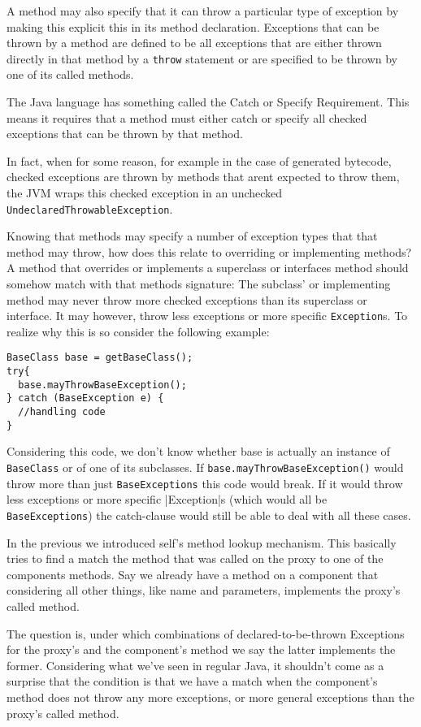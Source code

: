 \documentclass[a4paper,12pt]{book}
\begin{document}
A method may also specify that it can throw a particular type of exception by making this explicit this in its method declaration. Exceptions that can be thrown by a method are defined to be all exceptions that are either thrown directly in that method by a \verb|throw| statement or are specified to be thrown by one of its called methods.

The Java language has something called the Catch or Specify Requirement. This means it requires that a method must either catch or specify all checked exceptions that can be thrown by that method. 

In fact, when for some reason, for example in the case of generated bytecode, checked exceptions are thrown by methods that arent expected to throw them, the JVM wraps this checked exception in an unchecked \verb|UndeclaredThrowableException|.

Knowing that methods may specify a number of exception types that that method may throw, how does this relate to overriding or implementing methods? A method that overrides or implements a superclass or interfaces method should somehow match with that methods signature: The subclass' or implementing method may never throw more checked exceptions than its superclass or interface. It may however, throw less exceptions or more specific \verb|Exception|s. To realize why this is so consider the following example:

\begin{verbatim}
BaseClass base = getBaseClass();
try{
  base.mayThrowBaseException();
} catch (BaseException e) {
  //handling code
}
\end{verbatim}

Considering this code, we don't know whether base is actually an instance of \verb|BaseClass| or of one of its subclasses. If \verb|base.mayThrowBaseException()| would throw more than just \verb|BaseExceptions| this code would break. If it would throw less exceptions or more specific |Exception|s (which would all be \verb|BaseExceptions|) the catch-clause would still be able to deal with all these cases.

In the previous we introduced self's method lookup mechanism. This basically tries to find a match the method that was called on the proxy to one of the components methods. Say we already have a method on a component that considering all other things, like name and parameters, implements the proxy's called method.

The question is, under which combinations of declared-to-be-thrown Exceptions for the proxy's and the component's method we say the latter implements the former. Considering what we've seen in regular Java, it shouldn't come as a surprise that the condition is that we have a match when the component's method does not throw any more exceptions, or more general exceptions than the proxy's called method.
\end{document}
